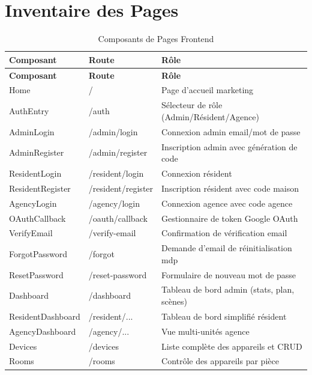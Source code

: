 \section{Inventaire des Pages}

\begin{center}
\begin{longtable}{p{} p{} p{}}
\caption{Composants de Pages Frontend}\label{tab:pages}\\
\toprule
\textbf{Composant} & \textbf{Route} & \textbf{Rôle} \\
\midrule
\endfirsthead
\toprule
\textbf{Composant} & \textbf{Route} & \textbf{Rôle} \\
\midrule
\endhead
\bottomrule
\endfoot
Home               & /                & Page d'accueil marketing \\
AuthEntry          & /auth            & Sélecteur de rôle (Admin/Résident/Agence) \\
AdminLogin         & /admin/login     & Connexion admin email/mot de passe \\
AdminRegister      & /admin/register  & Inscription admin avec génération de code \\
ResidentLogin      & /resident/login  & Connexion résident \\
ResidentRegister   & /resident/register & Inscription résident avec code maison \\
AgencyLogin        & /agency/login    & Connexion agence avec code agence \\
OAuthCallback      & /oauth/callback  & Gestionnaire de token Google OAuth \\
VerifyEmail        & /verify-email    & Confirmation de vérification email \\
ForgotPassword     & /forgot          & Demande d'email de réinitialisation mdp \\
ResetPassword      & /reset-password  & Formulaire de nouveau mot de passe \\
Dashboard          & /dashboard       & Tableau de bord admin (stats, plan, scènes) \\
ResidentDashboard  & /resident/...    & Tableau de bord simplifié résident \\
AgencyDashboard    & /agency/...      & Vue multi-unités agence \\
Devices            & /devices         & Liste complète des appareils et CRUD \\
Rooms              & /rooms           & Contrôle des appareils par pièce \\

\end{longtable}
\end{center}

